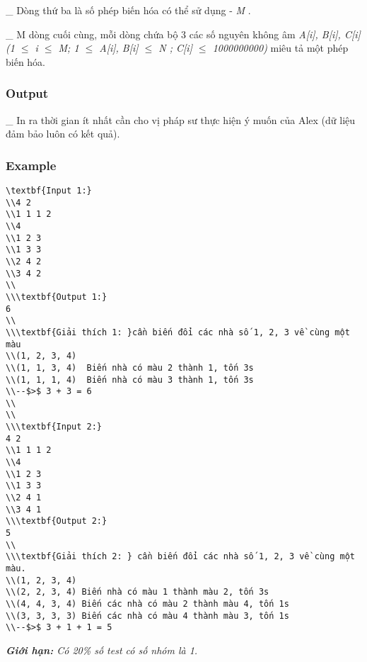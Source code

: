   \_ Dòng thứ ba là số phép biến hóa có thể sử dụng -   \emph{    M   }   .  

   \_ M dòng cuối cùng, mỗi dòng chứa bộ 3 các số nguyên không âm   \emph{    A[i], B[i], C[i] (1  $\le$  i  $\le$  M; 1  $\le$  A[i], B[i]  $\le$  N ; C[i]  $\le$  1000000000)   }   miêu tả một phép biến hóa.  

\subsubsection{   Output  }

   \_ In ra thời gian ít nhất cần cho vị pháp sư thực hiện ý muốn của Alex (dữ liệu đảm bảo luôn có kết quả).  



\subsubsection{   Example  }
\begin{verbatim}
\textbf{Input 1:}
\\4 2 
\\1 1 1 2
\\4
\\1 2 3
\\1 3 3
\\2 4 2
\\3 4 2
\\
\\\textbf{Output 1:}
6
\\
\\\textbf{Giải thích 1: }cần biến đổi các nhà số 1, 2, 3 về cùng một màu
\\(1, 2, 3, 4)
\\(1, 1, 3, 4)  Biến nhà có màu 2 thành 1, tốn 3s
\\(1, 1, 1, 4)  Biến nhà có màu 3 thành 1, tốn 3s
\\--$>$ 3 + 3 = 6
\\
\\
\\\textbf{Input 2:}
4 2 
\\1 1 1 2
\\4
\\1 2 3
\\1 3 3
\\2 4 1
\\3 4 1
\\\textbf{Output 2:}
5 
\\
\\\textbf{Giải thích 2: } cần biến đổi các nhà số 1, 2, 3 về cùng một màu.
\\(1, 2, 3, 4)
\\(2, 2, 3, 4) Biến nhà có màu 1 thành màu 2, tốn 3s
\\(4, 4, 3, 4) Biến các nhà có màu 2 thành màu 4, tốn 1s
\\(3, 3, 3, 3) Biến các nhà có màu 4 thành màu 3, tốn 1s
\\--$>$ 3 + 1 + 1 = 5\end{verbatim}

\emph{\textbf{      Giới hạn:     }\textbf{}     Có 20\% số test có số nhóm là 1.    }
